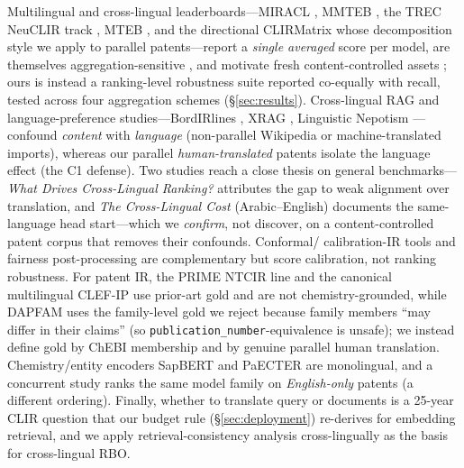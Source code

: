 \documentclass[11pt]{article}
\begin{document}
Multilingual and cross-lingual leaderboards---MIRACL \citep{miracl2023}, MMTEB
\citep{mmteb2025}, the TREC NeuCLIR track \citep{neuclir2023}, MTEB
\citep{muennighoff2023mteb}, and the directional CLIRMatrix
\citep{clirmatrix2020} whose decomposition style we apply to parallel
patents---report a \emph{single averaged} score per model, are themselves
aggregation-sensitive \citep{rankingrobustness2026,mmteb2025}, and motivate fresh
content-controlled assets \citep{mteb_contamination2025}; ours is instead a
ranking-level robustness suite reported co-equally with recall, tested across
four aggregation schemes (\S\ref{sec:results}). Cross-lingual RAG and
language-preference studies---BordIRlines \citep{bordirlines2024}, XRAG
\citep{xrag2025}, Linguistic Nepotism \citep{nepotism2025}---confound
\emph{content} with \emph{language} (non-parallel Wikipedia or
machine-translated imports), whereas our parallel \emph{human-translated} patents
isolate the language effect (the C1 defense). Two studies reach a close
thesis on general benchmarks---\emph{What Drives Cross-Lingual Ranking?}
\citep{whatdrivesclir2025} attributes the gap to weak alignment over translation,
and \emph{The Cross-Lingual Cost} \citep{crosslingualcost2025} (Arabic--English)
documents the same-language head start---which we \emph{confirm}, not discover, on
a content-controlled patent corpus that removes their confounds. Conformal/
calibration-IR tools \citep{traq2023,conflare2024,conformalrag2025} and
fairness post-processing \citep{fairnessot2023,buyl2022optimal} are complementary
but score calibration, not ranking robustness. For patent IR, the PRIME NTCIR
line \citep{prime2002} and the canonical multilingual CLEF-IP \citep{clefip2013}
use prior-art gold and are not chemistry-grounded, while DAPFAM
\citep{dapfam2025} uses the family-level gold we reject because family members
``may differ in their claims'' (so \texttt{publication\_number}-equivalence is
unsafe); we instead define gold by ChEBI \citep{chebi2016} membership and by
genuine parallel human translation. Chemistry/entity encoders SapBERT
\citep{sapbert2021} and PaECTER \citep{paecter2024} are monolingual, and a
concurrent study \citep{patentembeddings2026} ranks the same model family on
\emph{English-only} patents (a different ordering). Finally, whether to translate
query or documents is a 25-year CLIR question
\citep{oard1998,salehpecina2020,kishida2008} that our budget rule
(\S\ref{sec:deployment}) re-derives for embedding retrieval, and we apply
retrieval-consistency analysis \citep{bailey2017consistency} cross-lingually as
the basis for cross-lingual RBO.
\end{document}
